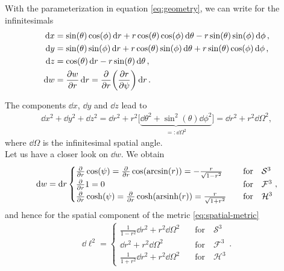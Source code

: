 \noindent With the parameterization in equation \eqref{eq:geometry}, we can write for the infinitesimals 
\begin{align*}
    \dd{x} &= \sin(\theta) \cos(\phi) \dd{r} + r \cos(\theta) \cos(\phi) \dd{\theta} - r \sin(\theta) \sin(\phi) \dd{\phi}, \nonumber \\
    \dd{y} &= \sin(\theta) \sin(\phi) \dd{r} + r \cos(\theta) \sin(\phi) \dd{\theta} + r \sin(\theta) \cos(\phi) \dd{\phi}, \nonumber \\
    \dd{z} &= \cos(\theta) \dd{r} - r \sin(\theta) \dd{\theta}, \nonumber \\
    \dd{w} &= \pdv{w}{r} \dd{r} = \pdv{}{r} \biggl(\pdv{r}{\psi}\biggr) \dd{r} \nonumber.
\end{align*}

\noindent The components $\dd{x}$, $\dd{y}$ and $\dd{z}$ lead to 
\begin{align*}
    \dd{x}^2 + \dd{y}^2 + \dd{z}^2 = \dd{r}^2 + r^2 \bigl[ \underbrace{\dd{\theta}^2 + \sin^2(\theta) \dd{\phi}^2}_{=: \dd{\Omega}^2} \bigr] = \dd{r}^2 + r^2 \dd{\Omega}^2,
\end{align*}
where $\dd{\Omega}$ is the infinitesimal spatial angle. \\
Let us have a closer look on $\dd{w}$. We obtain
\begin{align}
    \dd{w} = \dd{r} \begin{cases} 
                        \pdv{}{r} \cos(\psi) = \pdv{}{r} \cos(\arcsin(r)) = -\frac{r}{\sqrt{1 - r^2}} \quad &\text{for} \quad \mathcal{S}^{3} \\
                        \pdv{}{r} 1 = 0 \quad &\text{for} \quad \mathcal{F}^{3} \\
                        \pdv{}{r} \cosh(\psi) = \pdv{}{r} \cosh(\operatorname{arsinh}(r)) = \frac{r}{\sqrt{1 + r^2}} \quad &\text{for} \quad \mathcal{H}^{3}
                    \end{cases}, 
\end{align}
and hence for the spatial component of the metric \eqref{eq:spatial-metric}
\begin{align}
    \dd{\ell}^2 = \begin{cases}
                      \frac{1}{1 - r^2} \dd{r}^2 + r^2 \dd{\Omega}^2 \quad &\text{for} \quad \mathcal{S}^{3} \\
                      \dd{r}^2 + r^2 \dd{\Omega}^2 \quad &\text{for} \quad \mathcal{F}^{3} \\
                      \frac{1}{1 + r^2} \dd{r}^2 + r^2 \dd{\Omega}^2 \quad &\text{for} \quad \mathcal{H}^{3}
                  \end{cases}. \label{eq:spatial-metric-cases}
\end{align}
